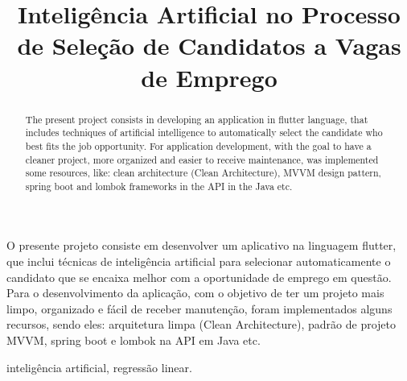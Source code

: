 \documentclass[conference]{IEEEtran}
\begin{document}
\title{Inteligência Artificial no Processo de Seleção de Candidatos a Vagas de Emprego\\

}



\author{
\and
{}
\and
{}
}

\maketitle

\begin{resumo}
O presente projeto consiste em desenvolver um aplicativo na linguagem flutter, que inclui técnicas de inteligência artificial para selecionar automaticamente o candidato que se encaixa melhor com a oportunidade de emprego em questão. Para o desenvolvimento da aplicação, com o objetivo de ter um projeto mais limpo, organizado e fácil de receber manutenção, foram implementados alguns recursos, sendo eles: arquitetura limpa (Clean Architecture), padrão de projeto MVVM, spring boot e lombok na API em Java etc.
\end{resumo}

\begin{IEEEpalavrachave}
inteligência artificial, regressão linear.
\end{IEEEpalavrachave}

\begin{abstract}
The present project consists in developing an application in flutter language, that includes techniques of artificial intelligence to automatically select the candidate who best fits the job opportunity. For application development, with the goal to have a cleaner project, more organized and easier to receive maintenance, was implemented some resources, like: clean architecture (Clean Architecture), MVVM design pattern, spring boot and lombok frameworks in the API in the Java etc.
\end{abstract}
\end{document}
